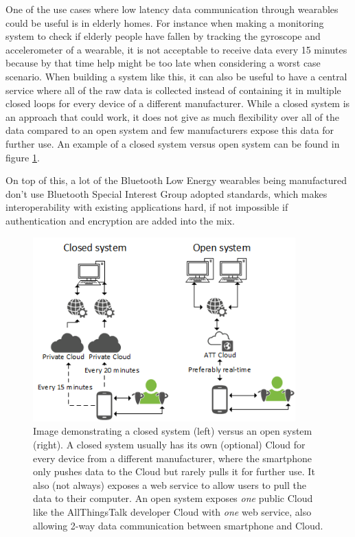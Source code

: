 \documentclass[pdftex,a4paper,12pt,twoside]{report}
\begin{document}
One of the use cases where low latency data communication through wearables could be useful is in elderly homes. For instance when making a monitoring system to check if elderly people have fallen by tracking the gyroscope and accelerometer of a wearable, it is not acceptable to receive data every 15 minutes because by that time help might be too late when considering a worst case scenario. When building a system like this, it can also be useful to have a central service where all of the raw data is collected instead of containing it in multiple closed loops for every device of a different manufacturer. While a closed system is an approach that could work, it does not give as much flexibility over all of the data compared to an open system and few manufacturers expose this data for further use. An example of a closed system versus open system can be found in figure \ref{fig:networkloops}.

On top of this, a lot of the Bluetooth Low Energy wearables being manufactured don't use Bluetooth Special Interest Group adopted standards, which makes interoperability with existing applications hard, if not impossible if authentication and encryption are added into the mix.

\begin{figure}[h]
    \centering
    \includegraphics[width=0.9\textwidth]{img/networkloop.png}
    \caption[Image demonstrating a closed Cloud system versus an open Cloud system]{Image demonstrating a closed system (left) versus an open system (right). A closed system usually has its own (optional) Cloud for every device from a different manufacturer, where the smartphone only pushes data to the Cloud but rarely pulls it for further use. It also (not always) exposes a web service to allow users to pull the data to their computer. An open system exposes \textit{one} public Cloud like the AllThingsTalk developer Cloud with \textit{one} web service, also allowing 2-way data communication between smartphone and Cloud.}
    \label{fig:networkloops}
\end{figure}
\end{document}
